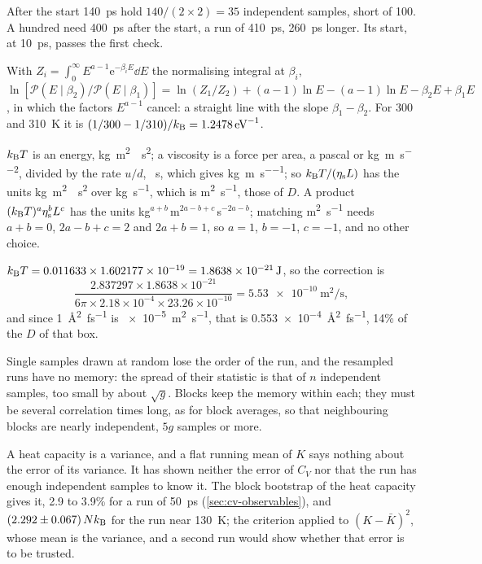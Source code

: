 After the start \SI{140}{\pico\second} hold
$140/(2\times2) = 35$ independent samples, short of 100. A hundred need
\SI{400}{\pico\second} after the start, a run of \SI{410}{\pico\second},
\SI{260}{\pico\second} longer. Its start, at \SI{10}{\pico\second}, passes
the first check.

With $Z_i = \int_0^\infty E^{a-1}
\mathrm{e}^{-\beta_iE}\dd E$ the normalising integral at $\beta_i$,
$\ln[\mathcal{P}(E \mid \beta_2)/\mathcal{P}(E \mid \beta_1)] = \ln(Z_1/Z_2) + (a - 1)\ln E - (a - 1)\ln E - \beta_2E +
\beta_1E$, in which the factors $E^{a-1}$ cancel: a straight line with the
slope $\beta_1 - \beta_2$. For 300 and \SI{310}{\kelvin} it is
$(1/300 - 1/310)/k_{\mathrm{B}} = \SI{1.2478}{\per\electronvolt}$.

$k_{\mathrm{B}} T$ is an energy, \si{\kilo\gram\metre\squared
\per\second\squared}; a viscosity is a force per area, a pascal or
\si{\kilo\gram\per\metre\per\second\squared}, divided by the rate $u/d$,
\si{\per\second}, which gives \si{\kilo\gram\per\metre\per\second}; so
$k_{\mathrm{B}} T/(\eta_{\mathrm s}L)$ has the units \si{\kilo\gram\metre\squared
\per\second\squared} over \si{\kilo\gram\per\second}, which is
\si{\metre\squared\per\second}, those of $D$. A product $(k_{\mathrm{B}}
T)^a\eta_{\mathrm s}^bL^c$ has the units
\si{\kilo\gram}$^{a+b}$\,\si{\metre}$^{2a-b+c}$\,\si{\second}$^{-2a-b}$;
matching \si{\metre\squared\per\second} needs $a + b = 0$, $2a - b + c =
2$ and $2a + b = 1$, so $a = 1$, $b = -1$, $c = -1$, and no other choice.

$k_{\mathrm{B}} T = 0.011633\times1.602177\times10^{-19} =
\SI{1.8638e-21}{\joule}$, so the correction is
\begin{equation*}
   \frac{2.837297\times1.8638\times10^{-21}}{6\pi\times2.18\times10^{-4}
   \times23.26\times10^{-10}} = \SI{5.53e-10}{\metre\squared\per\second} ,
\end{equation*}
and since \SI{1}{\angstrom\squared\per\femto\second} is
\SI{e-5}{\metre\squared\per\second}, that is
\SI{0.553e-4}{\angstrom\squared\per\femto\second}, 14\% of the $D$ of that
box.

Single samples drawn at random lose the order
of the run, and the resampled runs have no memory: the spread of their
statistic is that of $n$ independent samples, too small by about $\sqrt g$.
Blocks keep the memory within each; they must be several correlation
times long, as for block averages, so that neighbouring blocks are nearly
independent, $5g$ samples or more.

A heat capacity is a variance, and a flat running
mean of $K$ says nothing about the error of its variance. It has shown
neither the error of $C_V$ nor that the run has enough independent samples
to know it. The block bootstrap of the heat capacity gives it, 2.9 to
3.9\% for a run of \SI{50}{\pico\second} (\cref{sec:cv-observables}), and
$(2.292 \pm 0.067)\,Nk_{\mathrm{B}}$ for the run near \SI{130}{\kelvin}; the
criterion applied to $(K - \bar K)^2$, whose mean is the variance, and a
second run would show whether that error is to be trusted.
